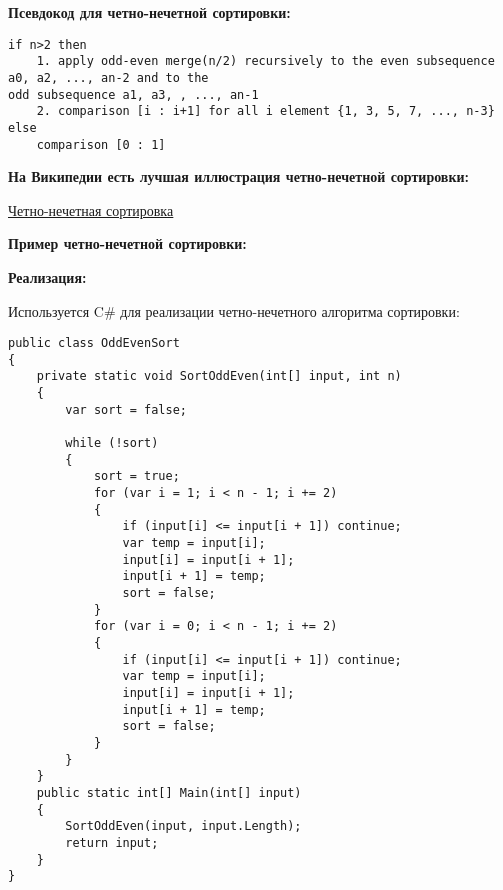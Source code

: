 \vspace{\baselineskip}
\textbf{Псевдокод для четно-нечетной сортировки:}

\vspace{\baselineskip}
\begin{tcolorbox}
\begin{verbatim} 
if n>2 then
    1. apply odd-even merge(n/2) recursively to the even subsequence a0, a2, ..., an-2 and to the
odd subsequence a1, a3, , ..., an-1
    2. comparison [i : i+1] for all i element {1, 3, 5, 7, ..., n-3}
else
    comparison [0 : 1]

\end{verbatim}
\end{tcolorbox}

\vspace{\baselineskip}
\textbf{На Википедии есть лучшая иллюстрация четно-нечетной сортировки:}

\vspace{\baselineskip}
\href{https://i.stack.imgur.com/FVktW.gif}{\underline{Четно-нечетная сортировка}}

\vspace{\baselineskip}
\textbf{Пример четно-нечетной сортировки:}

\vspace{\baselineskip}

\vspace{\baselineskip}
\textbf{Реализация:}

\vspace{\baselineskip}
Используется C\# для реализации четно-нечетного алгоритма сортировки:

\vspace{\baselineskip}
\begin{tcolorbox}
\begin{verbatim} 
public class OddEvenSort
{
    private static void SortOddEven(int[] input, int n)
    {
        var sort = false;
        
        while (!sort)
        {
            sort = true;
            for (var i = 1; i < n - 1; i += 2)
            {
                if (input[i] <= input[i + 1]) continue;
                var temp = input[i];
                input[i] = input[i + 1];
                input[i + 1] = temp;
                sort = false;
            }
            for (var i = 0; i < n - 1; i += 2)
            {
                if (input[i] <= input[i + 1]) continue;
                var temp = input[i];
                input[i] = input[i + 1];
                input[i + 1] = temp;
                sort = false;
            }
        }
    }
    public static int[] Main(int[] input)
    {
        SortOddEven(input, input.Length);
        return input;
    }
}
\end{verbatim}
\end{tcolorbox}


